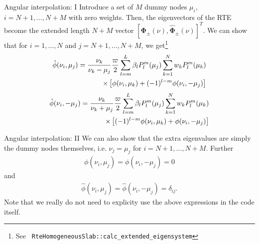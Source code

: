 \documentclass[14]{beamer}
\newcommand{\gvec}[1]{\boldsymbol{#1}}
\begin{document}
\begin{frame}{Angular interpolation: I}
  Introduce a set of $M$ dummy nodes $\mu_i$, $i=N+1,\ldots,N+M$ with
  zero weights. Then, the eigenvectors of the RTE become the extended
  length $N+M$ vector $[\gvec{\Phi}_\pm(\nu),
  \hat{\gvec{\Phi}}_\pm(\nu)]^T$. We can show that for $i=1,\ldots,N$
  and $j=N+1,\ldots,N+M$, we get\footnote{See {\tt
      RteHomogeneousSlab::calc\_extended\_eigensystem}}
  \begin{align}
    \hat{\phi}(\nu_i,\mu_j) = \frac{\nu_k}{\nu_k-\mu_j} \frac{\varpi}{2}
    \sum_{l=m}^L \beta_l P_l^m(\mu_j) \sum_{k=1}^N
    w_k P_l^m(\mu_k) \notag \\
    \times \left[
      \phi(\nu_i,\mu_k) + (-1)^{l-m}\phi(\nu_i,-\mu_j)
    \right]
    \end{align}
    \begin{align}
    \hat{\phi}(\nu_i,-\mu_j) = \frac{\nu_k}{\nu_k+\mu_j} \frac{\varpi}{2}
    \sum_{l=m}^L \beta_l P_l^m(\mu_j) \sum_{k=1}^N
    w_k P_l^m(\mu_k) \notag \\
    \times \left[
      (-1)^{l-m} \phi(\nu_i,\mu_k) + \phi(\nu_i,-\mu_j)
    \right]
  \end{align}
\end{frame}

\begin{frame}{Angular interpolation: II}
  We can also show that the extra eigenvalues are simply the dummy
  nodes themselves, i.e. $\nu_j = \mu_j$ for
  $i=N+1,\ldots,N+M$. Further
  \begin{align}
    \phi(\nu_i,\mu_j) = \phi(\nu_i,-\mu_j) = 0
  \end{align}
  and
  \begin{align}
    \hat{\phi}(\nu_i,\mu_j) = \hat{\phi}(\nu_i,-\mu_j) = \delta_{ij}.
  \end{align}
  Note that we really do not need to explicity use the above
  expressions in the code itself.
\end{frame}
\end{document}
